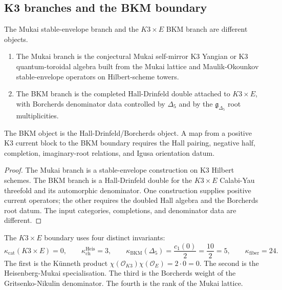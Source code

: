 \subsection{K3 branches and the BKM boundary}
\label{subsec:qtet-k3-branches}

\begin{proposition}
\label{prop:qtet-two-k3-branches}
The Mukai stable-envelope branch and the \(K3\times E\) BKM branch are
different objects.
\begin{enumerate}[label=\textup{(\roman*)}]
\item The Mukai branch is the conjectural Mukai self-mirror K3 Yangian
or K3 quantum-toroidal algebra built from the Mukai lattice and
Maulik-Okounkov stable-envelope operators on Hilbert-scheme towers.
\item The BKM branch is the completed Hall-Drinfeld double attached
to \(K3\times E\), with Borcherds denominator data controlled by
\(\Delta_5\) and by the \(\mathfrak g_{\Delta_5}\) root
multiplicities.
\end{enumerate}
The BKM object is the Hall-Drinfeld/Borcherds object.  A map from a
positive K3 current block to the BKM boundary requires the Hall pairing,
negative half, completion, imaginary-root relations, and Igusa
orientation datum.
\end{proposition}

\begin{proof}
The Mukai branch is a stable-envelope construction on K3 Hilbert
schemes.  The BKM branch is a Hall-Drinfeld double for the
\(K3\times E\) Calabi-Yau threefold and its automorphic denominator.
One construction supplies positive current operators; the other
requires the doubled Hall algebra and the Borcherds root datum.  The
input categories, completions, and denominator data are different.
\end{proof}

\begin{proposition}
\label{prop:qtet-k3xe-four-invariants}
The \(K3\times E\) boundary uses four distinct invariants:
\[
  \kappa_{\mathrm{cat}}(K3\times E)=0,\qquad
  \kappa_{\mathrm{ch}}^{\mathrm{Heis}}=3,\qquad
  \kappa_{\mathrm{BKM}}(\Delta_5)=\frac{c_1(0)}2=\frac{10}{2}=5,
  \qquad
  \kappa_{\mathrm{fiber}}=24.
\]
The first is the K\"unneth product
\(\chi(\mathcal O_{K3})\chi(\mathcal O_E)=2\cdot0=0\).  The second is
the Heisenberg-Mukai specialisation.  The third is the Borcherds
weight of the Gritsenko-Nikulin denominator.  The fourth is the rank of
the Mukai lattice.
\end{proposition}

